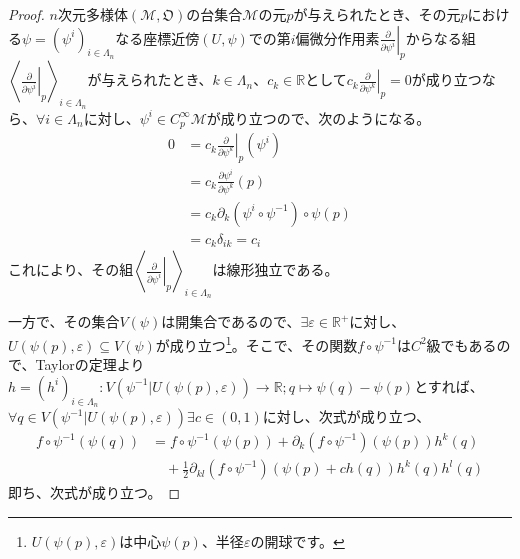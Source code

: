 \documentclass[dvipdfmx]{jsarticle}
\begin{document}
\begin{proof}
  $n$次元多様体$\left(\mathcal{M},\mathfrak{O}\right)$の台集合$\mathcal{M}$の元$p$が与えられたとき、その元$p$における$\psi =\left(\psi^i \right)_{i\in \varLambda_n }$なる座標近傍$\left(U,\psi\right)$での第$i$偏微分作用素$\left. \frac{\partial}{\partial \psi^i }\right|_p $からなる組$\left\langle \left. \frac{\partial}{\partial \psi^i }\right|_p \right\rangle_{i\in \varLambda_n} $が与えられたとき、$k\in \varLambda_n $、$c_k \in \mathbb{R}$として$c_k \left. \frac{\partial }{\partial \psi^k } \right|_p =0$が成り立つなら、$\forall i\in \varLambda_n $に対し、$\psi^i \in C^\infty_p \mathcal{M}$が成り立つので、次のようになる。
  \begin{align*}
    0 &= c_k \left. \frac{\partial }{\partial \psi^k } \right|_p \left( \psi^i \right) \\
    &= c_k \frac{\partial \psi^i }{\partial \psi^k } \left(p\right) \\
    &= c_k \partial_k \left( \psi^i \circ \psi^{-1} \right) \circ \psi \left( p \right)\\
    &= c_k \delta_{ik} = c_i 
  \end{align*}
  これにより、その組$\left\langle \left. \frac{\partial}{\partial \psi^i }\right|_p \right\rangle_{i\in \varLambda_n} $は線形独立である。\par
  一方で、その集合$V\left(\psi\right)$は開集合であるので、$\exists \varepsilon \in \mathbb{R}^+$に対し、$U\left(\psi\left(p\right),\varepsilon\right)\subseteq V\left(\psi\right)$が成り立つ\footnote{$U\left(\psi\left(p\right),\varepsilon\right)$は中心$\psi\left(p\right)$、半径$\varepsilon$の開球です。}。そこで、その関数$f\circ \psi^{-1}$は$C^2$級でもあるので、Taylorの定理より$h=\left(h^i \right)_{i\in \varLambda_n } :V\left(\psi^{-1}|U\left(\psi\left(p\right),\varepsilon\right)\right) \rightarrow \mathbb{R} ;q\mapsto \psi \left(q\right) -\psi \left(p\right)$とすれば、$\forall q\in V\left(\psi^{-1}|U\left(\psi\left(p\right),\varepsilon\right)\right)\exists c\in \left(0,1\right)$に対し、次式が成り立つ、
  \begin{align*}
    f\circ \psi^{-1} \left(\psi \left(q\right) \right) &=f\circ \psi^{-1} \left(\psi\left(p\right)\right) +\partial_k \left(f\circ \psi^{-1}\right) \left(\psi\left(p\right)\right) h^k \left(q \right) \\
    &\quad +\frac{1}{2}\partial_{kl} \left(f\circ \psi^{-1}\right) \left(\psi\left(p\right) +ch\left(q\right)\right) h^k \left(q\right) h^l \left(q\right)
  \end{align*}
  即ち、次式が成り立つ。

\end{proof}
\end{document}
